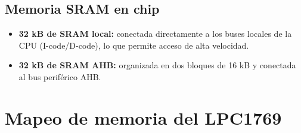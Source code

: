 ﻿\documentclass[11pt]{article}
\begin{document}
\subsection{Memoria SRAM en chip}
\begin{itemize}
  \item \textbf{32 kB de SRAM local:} conectada directamente a los buses locales de la CPU (I-code/D-code), lo que permite acceso de alta velocidad.
  \item \textbf{32 kB de SRAM AHB:} organizada en dos bloques de 16 kB y conectada al bus periférico AHB.
\end{itemize}

\section{Mapeo de memoria del LPC1769}
\end{document}
